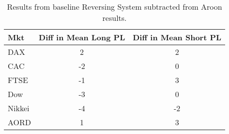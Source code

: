 \begin{table}[ht]
\centering
\caption[Aroon results minus baseline]{Results from baseline Reversing System subtracted from Aroon results.} 
\label{tab:aroon_results_diff}
\begin{tabular}{lcc}
  \toprule Mkt & Diff in Mean Long PL & Diff in Mean Short PL \\ 
  \midrule DAX & 2 & 2 \\ 
  CAC & -2 & 0 \\ 
  FTSE & -1 & 3 \\ 
  Dow & -3 & 0 \\ 
  Nikkei & -4 & -2 \\ 
  AORD & 1 & 3 \\ 
   \bottomrule \end{tabular}
\end{table}
